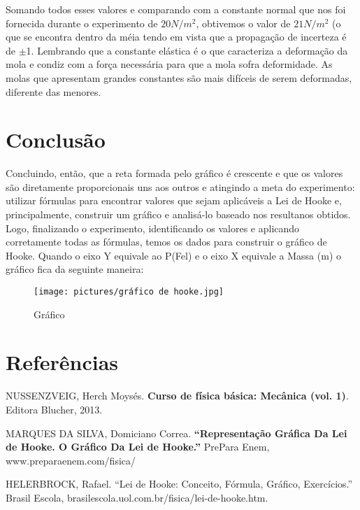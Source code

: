 \documentclass[a4paper, 12pt]{article}
\begin{document}
Somando todos esses valores e comparando com a constante normal que nos foi fornecida durante o experimento de $20 N/m ^ {2}$, obtivemos o valor de $21 N/m ^ {2}$ (o que se encontra dentro da méia tendo em vista que a propagação de incerteza é de $\pm$1. Lembrando que a constante elástica é o que caracteriza a deformação da mola e condiz com a força necessária para que a mola sofra deformidade. As molas que apresentam grandes constantes são mais difíceis de serem deformadas, diferente das menores. 


\section{Conclusão}
Concluindo, então, que a reta formada pelo gráfico é crescente e que os valores são diretamente proporcionais uns aos outros e atingindo a meta do experimento: utilizar fórmulas para encontrar valores que sejam aplicáveis a Lei de Hooke e, principalmente, construir um gráfico e analisá-lo baseado nos resultanos obtidos.
Logo, finalizando o experimento, identificando os valores e aplicando corretamente todas as fórmulas, temos os dados para construir o gráfico de Hooke. Quando o eixo Y equivale ao P(Fel) e o eixo X equivale a Massa (m) o gráfico fica da seguinte maneira:

\begin{figure}[!ht]
\centering 
\texttt{[image: pictures/gráfico de hooke.jpg]} 
\caption{Gráfico} 
\label{Fig02} 
\end{figure}


\pagebreak
\section{Referências}
NUSSENZVEIG, Herch Moysés. \textbf{Curso de física básica: Mecânica (vol. 1)}. Editora Blucher, 2013. \vspace{1}

MARQUES DA SILVA, Domiciano Correa. \textbf{“Representação Gráfica Da Lei de Hooke. O Gráfico Da Lei de Hooke.”} PrePara Enem, www.preparaenem.com/fisica/ \vspace{1}

HELERBROCK, Rafael. “Lei de Hooke: Conceito, Fórmula, Gráfico, Exercícios.” Brasil Escola, brasilescola.uol.com.br/fisica/lei-de-hooke.htm.
‌
\end{document}
